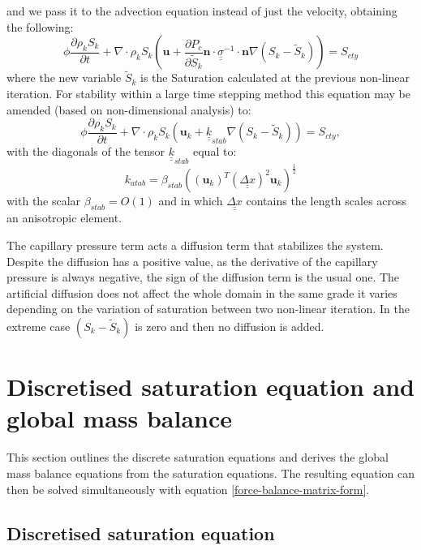  and we pass it to the advection equation instead of just the velocity, obtaining the following:%
\begin{equation}
\phi \frac{\partial  \rho_k S_k}{\partial t} + \nabla \cdot \rho_k S_k (\mathbf{u} +  \frac{\partial  P_c}{\partial \tilde{S}_k}  \mathbf{n}\cdot \underline {\underline\sigma}^{-1} \cdot \mathbf{n} \nabla (S_k - \tilde{S}_k) ) = S_{cty} 
\end{equation}
where the new variable $  \tilde{S}_k$ is the Saturation calculated at the previous non-linear iteration. 
For stability within a large time stepping method this equation may be amended (based on non-dimensional analysis) to:
\begin{equation}
\phi \frac{\partial  \rho_k S_k}{\partial t} + \nabla \cdot \rho_k S_k (\mathbf{u}_k +  {\underline{\underline k}}_{stab}  \nabla (S_k - \tilde{S}_k) ) = S_{cty}, 
\end{equation} 
with the diagonals of the tensor ${\underline{\underline k}}_{stab}$ equal to:
\begin{equation}
 k_{atab}  =  \beta_{stab} ( (\mathbf{u}_k)^T (\underline{\underline {\Delta x}})^2\mathbf{u}_k )^{\frac{1}{2}}
\end{equation} 
with the scalar $\beta_{stab}=O(1)$ and in which $\underline{\underline {\Delta x}}$ contains the 
length scales across an anisotropic element. 

The capillary pressure term acts a diffusion term that stabilizes the system. Despite the diffusion has a positive value, as the derivative of the capillary pressure is always negative, the sign of the diffusion term is the usual one. The artificial diffusion does not affect the whole domain in the same grade it varies depending on the variation of saturation between two non-linear iteration. In the extreme case $ (S_k - \tilde{S}_k) $ is zero and then no diffusion is added.

\section{Discretised saturation equation and global mass balance} 

This section outlines the discrete saturation equations and derives the global mass balance equations from the saturation equations. The resulting equation can then be solved simultaneously with equation \ref{force-balance-matrix-form}. 
										

\subsection{Discretised saturation equation} 

